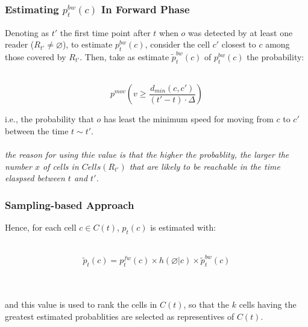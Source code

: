 
\begin{frame}
\frametitle{Estimating $p_t^{bw}(c)$ In Forward Phase}

Denoting as $t'$ the first time point after $t$ when $o$ was detected by at least one reader ($R_{t'} \neq \varnothing$), to estimate $p_t^{bw}(c)$,  consider the cell $c'$ closest to $c$ among those covered by $R_{t'}$. Then, take as estimate $\widetilde{p}_t^{bw}(c)$ of $p_t^{bw}(c)$ the probability:\\~\\

\pause

\begin{equation}
  p^{mov}(v \geq \frac{d_{min}(c,c')}{(t'-t)\cdot\Delta})
\end{equation}

\pause

i.e., the probability that $o$ has least the minimum speed for moving from $c$ to $c'$ between the time $t \sim t'$.\\~\\

\textit{the reason for using thie value is that the higher the probablity, the larger the number $x$ of cells in $Cells(R_{t'})$ that are likely to be reachable in the time elaspsed between $t$ and $t'$.}

\end{frame}


\begin{frame}
\frametitle{Sampling-based Approach}

Hence, for each cell $c \in C(t)$, $p_t(c)$ is estimated with:\\~\\

\pause

\begin{equation}
  \widetilde{p}_t(c) = p_t^{fw}(c) \times h(\varnothing|c) \times \widetilde{p}_t^{bw}(c)
\end{equation}\\~\\

\pause

and this value is used to rank the cells in $C(t)$, so that the $k$ cells having the greatest estimated probablities are selected as representives of $C(t)$.

\end{frame}
